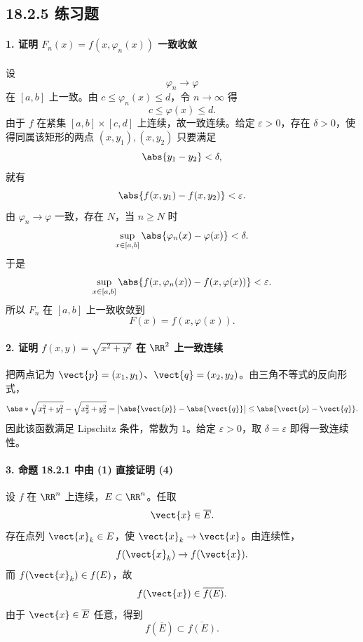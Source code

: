 \subsection*{18.2.5 练习题}

\paragraph{1. 证明 $F_n(x)=f(x,\varphi_n(x))$ 一致收敛}
\begin{xsolution}
设
\[
  \varphi_n\to\varphi
\]
在 $[a,b]$ 上一致。由 $c\le\varphi_n(x)\le d$，令 $n\to\infty$ 得
\[
  c\le\varphi(x)\le d.
\]
由于 $f$ 在紧集 $[a,b]\times[c,d]$ 上连续，故一致连续。给定 $\varepsilon>0$，存在 $\delta>0$，使得同属该矩形的两点 $(x,y_1),(x,y_2)$ 只要满足
\[
  \abs{y_1-y_2}<\delta,
\]
就有
\[
  \abs{f(x,y_1)-f(x,y_2)}<\varepsilon.
\]
由 $\varphi_n\to\varphi$ 一致，存在 $N$，当 $n\ge N$ 时
\[
  \sup_{x\in[a,b]}\abs{\varphi_n(x)-\varphi(x)}<\delta.
\]
于是
\[
  \sup_{x\in[a,b]}
  \abs{f(x,\varphi_n(x))-f(x,\varphi(x))}<\varepsilon.
\]
所以 $F_n$ 在 $[a,b]$ 上一致收敛到
\[
  F(x)=f(x,\varphi(x)).
\]
\end{xsolution}

\paragraph{2. 证明 $f(x,y)=\sqrt{x^2+y^2}$ 在 $\RR^2$ 上一致连续}
\begin{xsolution}
把两点记为 $\vect{p}=(x_1,y_1)$、$\vect{q}=(x_2,y_2)$。由三角不等式的反向形式，
\[
  \abs*{\sqrt{x_1^2+y_1^2}-\sqrt{x_2^2+y_2^2}}
  =\bigl|\abs{\vect{p}}-\abs{\vect{q}}\bigr|
  \le\abs{\vect{p}-\vect{q}}.
\]
因此该函数满足 Lipschitz 条件，常数为 $1$。给定 $\varepsilon>0$，取 $\delta=\varepsilon$ 即得一致连续性。
\end{xsolution}

\paragraph{3. 命题 18.2.1 中由 (1) 直接证明 (4)}
\begin{xsolution}
设 $f$ 在 $\RR^n$ 上连续，$E\subset\RR^n$。任取
\[
  \vect{x}\in\overline E.
\]
存在点列 $\vect{x}_k\in E$，使 $\vect{x}_k\to\vect{x}$。由连续性，
\[
  f(\vect{x}_k)\to f(\vect{x}).
\]
而 $f(\vect{x}_k)\in f(E)$，故
\[
  f(\vect{x})\in\overline{f(E)}.
\]
由于 $\vect{x}\in\overline E$ 任意，得到
\[
  \boxed{f(\overline E)\subset\overline{f(E)}}.
\]
\end{xsolution}

